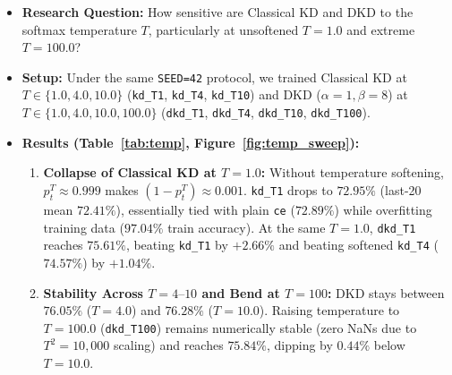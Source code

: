 \documentclass[11pt]{article}
\begin{document}
\begin{itemize}
    \item \textbf{Research Question:} How sensitive are Classical KD and DKD to the softmax temperature \(T\), particularly at unsoftened \(T=1.0\) and extreme \(T=100.0\)?
    \item \textbf{Setup:} Under the same \texttt{SEED=42} protocol, we trained Classical KD at \(T \in \{1.0, 4.0, 10.0\}\) (\texttt{kd\_T1}, \texttt{kd\_T4}, \texttt{kd\_T10}) and DKD (\(\alpha=1, \beta=8\)) at \(T \in \{1.0, 4.0, 10.0, 100.0\}\) (\texttt{dkd\_T1}, \texttt{dkd\_T4}, \texttt{dkd\_T10}, \texttt{dkd\_T100}).
    \item \textbf{Results (Table~\ref{tab:temp}, Figure~\ref{fig:temp_sweep}):}
    \begin{enumerate}
        \item \textbf{Collapse of Classical KD at \(T=1.0\):} Without temperature softening, \(p_t^T \approx 0.999\) makes \((1 - p_t^T) \approx 0.001\). \texttt{kd\_T1} drops to \(72.95\%\) (last-20 mean \(72.41\%\)), essentially tied with plain \texttt{ce} (\(72.89\%\)) while overfitting training data (\(97.04\%\) train accuracy). At the same \(T=1.0\), \texttt{dkd\_T1} reaches \(75.61\%\), beating \texttt{kd\_T1} by \(+2.66\%\) and beating softened \texttt{kd\_T4} (\(74.57\%\)) by \(+1.04\%\).
        \item \textbf{Stability Across \(T=4\text{--}10\) and Bend at \(T=100\):} DKD stays between \(76.05\%\) (\(T=4.0\)) and \(76.28\%\) (\(T=10.0\)). Raising temperature to \(T=100.0\) (\texttt{dkd\_T100}) remains numerically stable (zero NaNs due to \(T^2 = 10{,}000\) scaling) and reaches \(75.84\%\), dipping by \(0.44\%\) below \(T=10.0\).
    \end{enumerate}
\end{itemize}

\begin{table}[H]
\centering
\small
\caption{Study 2: Classical KD vs.\ DKD Across Softmax Temperatures \(T \in [1, 100]\) (\texttt{SEED=42}).}
\label{tab:temp}
\end{table}
\end{document}
